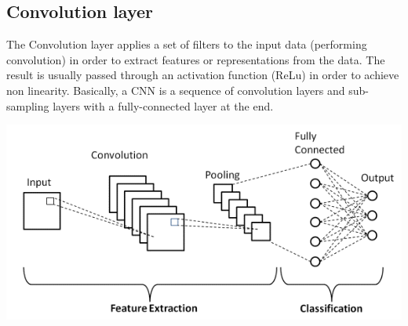 \subsection{Convolution layer}
The Convolution layer applies a set of filters to the input data (performing convolution) in order to extract features or representations from the data. The result is usually passed through an activation function (ReLu) in order to achieve non linearity. \newline\newline
Basically, a CNN is a sequence of convolution layers and sub-sampling layers with a fully-connected layer at the end.
\begin{center}
    \includegraphics[scale = 0.7]{images/CNN.png}
\end{center}
